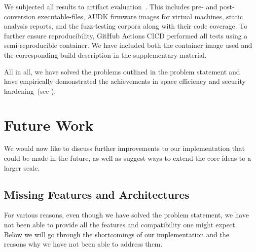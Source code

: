 We subjected all results to artifact evaluation~\cite{thesis-git}. This includes pre- and post-conversion \glspl{executable-file}, \gls{AUDK} \gls{firmware} images for virtual machines, static analysis reports, and the \gls{fuzz-testing} corpora along with their code coverage. To further ensure reproducibility, GitHub Actions \gls{CICD} performed all tests using a semi-reproducible container. We have included both the container image used and the corresponding build description in the supplementary material.

All in all, we have solved the problems outlined in the problem statement and have empirically demonstrated the achievements in space efficiency and security hardening~(see ).

\chapter{Future Work}
\label{chap:future_work}

We would now like to discuss further improvements to our implementation that could be made in the future, as well as suggest ways to extend the core ideas to a larger scale.

\section{Missing Features and Architectures}
\label{sec:missing_features_archs}

For various reasons, even though we have solved the problem statement, we have not been able to provide all the features and compatibility one might expect. Below we will go through the shortcomings of our implementation and the reasons why we have not been able to address them.

